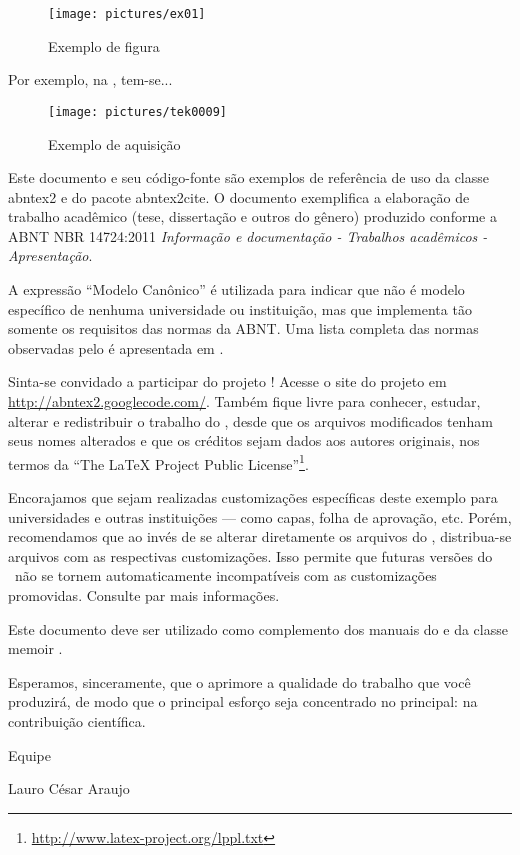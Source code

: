 \begin{figure}
	\centering
	\caption{Exemplo de figura}
	\texttt{[image: pictures/ex01]}
	\label{fig:ex01}
\end{figure}

Por exemplo, na , tem-se...


\begin{figure}
	\centering
	\texttt{[image: pictures/tek0009]}
	\caption{Exemplo de aquisição}
	\label{fig:tek0009}
\end{figure}

Este documento e seu código-fonte são exemplos de referência de uso da classe
\textsf{abntex2} e do pacote \textsf{abntex2cite}. O documento
exemplifica a elaboração de trabalho acadêmico (tese, dissertação e outros do
gênero) produzido conforme a ABNT NBR 14724:2011 \emph{Informação e documentação
- Trabalhos acadêmicos - Apresentação}.

A expressão ``Modelo Canônico'' é utilizada para indicar que \abnTeX{} não é
modelo específico de nenhuma universidade ou instituição, mas que implementa tão
somente os requisitos das normas da ABNT. Uma lista completa das normas
observadas pelo \abnTeX{} é apresentada em .

Sinta-se convidado a participar do projeto \abnTeX{}! Acesse o site do projeto em
\url{http://abntex2.googlecode.com/}. Também fique livre para conhecer,
estudar, alterar e redistribuir o trabalho do \abnTeX{}, desde que os arquivos
modificados tenham seus nomes alterados e que os créditos sejam dados aos
autores originais, nos termos da ``The \LaTeX{} Project Public
License''\footnote{\url{http://www.latex-project.org/lppl.txt}}.

Encorajamos que sejam realizadas customizações específicas deste exemplo para
universidades e outras instituições --- como capas, folha de aprovação, etc.
Porém, recomendamos que ao invés de se alterar diretamente os arquivos do
\abnTeX{}, distribua-se arquivos com as respectivas customizações.
Isso permite que futuras versões do \abnTeX{}~não se tornem automaticamente
incompatíveis com as customizações promovidas. Consulte
 par mais informações.

Este documento deve ser utilizado como complemento dos manuais do \abnTeX{}
\cite{abntex2classe,abntex2cite,abntex2cite-alf} e da classe \textsf{memoir}
\cite{memoir}.

Esperamos, sinceramente, que o \abnTeX{} aprimore a qualidade do trabalho que
você produzirá, de modo que o principal esforço seja concentrado no principal:
na contribuição científica.

Equipe \abnTeX{}

Lauro César Araujo


